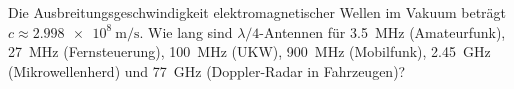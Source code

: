 \begin{ExerciseBlock}
Die Ausbreitungsgeschwindigkeit elektromagnetischer Wellen im Vakuum beträgt $c\approx\qty{2.998e8}{\metre\per\second}$. Wie lang sind $\lambda/4$-Antennen für \qty{3.5}{\mega\hertz} (Amateurfunk), \qty{27}{\mega\hertz} (Fernsteuerung), \qty{100}{\mega\hertz} (UKW), \qty{900}{\mega\hertz} (Mobilfunk), \qty{2.45}{\giga\hertz} (Mikrowellenherd) und \qty{77}{\giga\hertz} (Doppler-Radar in Fahrzeugen)?
\end{ExerciseBlock}
